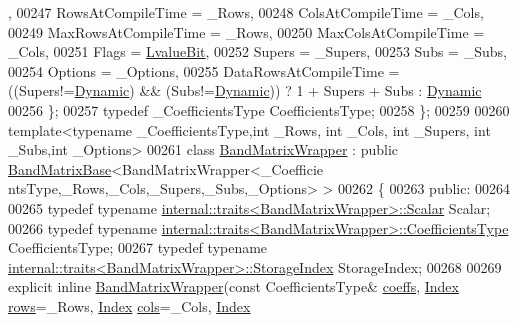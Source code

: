 \begin{DoxyCode}
      ,
00247     RowsAtCompileTime = \_Rows,
00248     ColsAtCompileTime = \_Cols,
00249     MaxRowsAtCompileTime = \_Rows,
00250     MaxColsAtCompileTime = \_Cols,
00251     Flags = \hyperlink{group__flags_gae2c323957f20dfdc6cb8f44428eaec1a}{LvalueBit},
00252     Supers = \_Supers,
00253     Subs = \_Subs,
00254     Options = \_Options,
00255     DataRowsAtCompileTime = ((Supers!=\hyperlink{namespace_eigen_ad81fa7195215a0ce30017dfac309f0b2}{Dynamic}) && (Subs!=\hyperlink{namespace_eigen_ad81fa7195215a0ce30017dfac309f0b2}{Dynamic})) ? 1 + Supers + Subs : 
      \hyperlink{namespace_eigen_ad81fa7195215a0ce30017dfac309f0b2}{Dynamic}
00256   \};
00257   \textcolor{keyword}{typedef} \_CoefficientsType CoefficientsType;
00258 \};
00259 
00260 \textcolor{keyword}{template}<\textcolor{keyword}{typename} \_CoefficientsType,\textcolor{keywordtype}{int} \_Rows, \textcolor{keywordtype}{int} \_Cols, \textcolor{keywordtype}{int} \_Supers, \textcolor{keywordtype}{int} \_Subs,\textcolor{keywordtype}{int} \_Options>
00261 \textcolor{keyword}{class }\hyperlink{class_eigen_1_1internal_1_1_band_matrix_wrapper}{BandMatrixWrapper} : \textcolor{keyword}{public} \hyperlink{class_eigen_1_1internal_1_1_band_matrix_base}{BandMatrixBase}<BandMatrixWrapper<\_Coefficie
      ntsType,\_Rows,\_Cols,\_Supers,\_Subs,\_Options> >
00262 \{
00263   \textcolor{keyword}{public}:
00264 
00265     \textcolor{keyword}{typedef} \textcolor{keyword}{typename} \hyperlink{struct_eigen_1_1internal_1_1traits}{internal::traits<BandMatrixWrapper>::Scalar}
       Scalar;
00266     \textcolor{keyword}{typedef} \textcolor{keyword}{typename} \hyperlink{struct_eigen_1_1internal_1_1traits}{internal::traits<BandMatrixWrapper>::CoefficientsType}
       CoefficientsType;
00267     \textcolor{keyword}{typedef} \textcolor{keyword}{typename} \hyperlink{struct_eigen_1_1internal_1_1traits}{internal::traits<BandMatrixWrapper>::StorageIndex}
       StorageIndex;
00268 
00269     \textcolor{keyword}{explicit} \textcolor{keyword}{inline} \hyperlink{class_eigen_1_1internal_1_1_band_matrix_wrapper}{BandMatrixWrapper}(\textcolor{keyword}{const} CoefficientsType& 
      \hyperlink{class_eigen_1_1internal_1_1_band_matrix_base_ab7c9e9a7ca5ad0f2f3a82ac582650499}{coeffs}, \hyperlink{namespace_eigen_a62e77e0933482dafde8fe197d9a2cfde}{Index} \hyperlink{group___core___module_a8141320ba8df384426c298b32b000d8e}{rows}=\_Rows, \hyperlink{namespace_eigen_a62e77e0933482dafde8fe197d9a2cfde}{Index} \hyperlink{group___core___module_a7b0b45c7351847696c911ce8aa2abbdb}{cols}=\_Cols, \hyperlink{namespace_eigen_a62e77e0933482dafde8fe197d9a2cfde}{Index} 

\end{DoxyCode}
